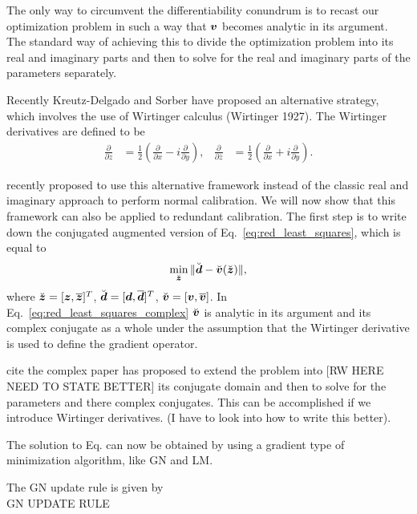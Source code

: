 \documentclass[useAMS,usenatbib]{mn2e}
\newcommand{\bz}{\bmath{z}}
\newcommand{\bd}{\bmath{d}}
\newcommand{\bv}{\bmath{v}}
\newcommand{\conj}[1]{\overline{#1}}
\begin{document}
The only way to circumvent the differentiability conundrum is to recast our optimization problem in such a way that $\bv$ becomes analytic in its argument.
The standard way of achieving this to divide the optimization problem into its real and imaginary parts and then to solve for the real and imaginary parts of the parameters separately.

Recently Kreutz-Delgado and Sorber have proposed an alternative strategy, which involves the use of Wirtinger calculus (Wirtinger 1927). The Wirtinger derivatives 
are defined to be 
\begin{align}
\frac{\partial}{\partial z} &= \frac{1}{2}\left ( \frac{\partial}{\partial x} -  i \frac{\partial}{\partial y} \right ),&\frac{\partial}{\partial \conj{z}} &= \frac{1}{2}\left ( \frac{\partial}{\partial x} +  i \frac{\partial}{\partial y} \right ). 
\end{align}


\cite{Smirnov2015} recently proposed to use this alternative framework instead of the classic real and imaginary approach to perform normal calibration. We will now show
that this framework can also be applied to redundant calibration. The first step is to write down the conjugated augmented version of Eq.~\eqref{eq:red_least_squares}, which is equal 
to
\begin{equation}
\label{eq:red_least_squares_complex}
\min_{\breve{\bz}} \|\breve{\bd} - \breve{\bv}(\breve{\bz})\|, 
\end{equation}
where $\breve{\bz} = [\bz,\conj{\bz}]^T$, $\breve{\bd} = [\bd,\conj{\bd}]^T$, $\breve{\bv} = [\bv,\conj{\bv}]$. 
In Eq.~\eqref{eq:red_least_squares_complex} $\breve{\bv}$ is analytic in its argument and its complex conjugate as a whole under the
assumption that the Wirtinger derivative is used to define the gradient operator.

cite the complex paper has proposed to extend the problem into [RW HERE NEED TO STATE BETTER] its conjugate domain and then to solve for the parameters and there complex conjugates. This can be accomplished
if we introduce Wirtinger derivatives. (I have to look into how to write this better).

The solution to Eq. can now be obtained by using a gradient type of minimization algorithm, like GN and LM. 

The GN update rule is given by\\

GN UPDATE RULE
\end{document}
